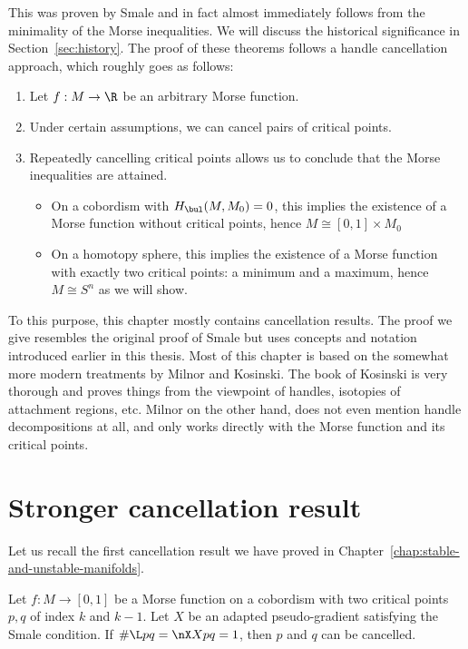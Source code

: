This was proven by Smale and in fact almost immediately follows from the minimality of the Morse inequalities.
We will discuss the historical significance in Section~\ref{sec:history}.
The proof of these theorems follows a handle cancellation approach, which roughly goes as follows:
\begin{enumerate}[(1)]
    \item Let $f: M \to  \R$ be an arbitrary Morse function.
    \item Under certain assumptions, we can cancel pairs of critical points.
    \item Repeatedly cancelling critical points allows us to conclude that the Morse inequalities are attained.
        \begin{itemize}
            \item On a cobordism with $H_\bul(M, M_0) = 0$, this implies the existence of a Morse function without critical points, hence $M \cong [0,1] \times M_0$
            \item On a homotopy sphere, this implies the existence of a Morse function with exactly two critical points: a minimum and a maximum,  hence $M \cong S^{n}$ as we will show.
        \end{itemize}
\end{enumerate}

To this purpose, this chapter mostly contains cancellation results.
The proof we give resembles the original proof of Smale but uses concepts and notation introduced earlier in this thesis.
Most of this chapter is based on the somewhat more modern treatments by Milnor and Kosinski.
The book of Kosinski is very thorough and proves things from the viewpoint of handles, isotopies of attachment regions, etc.
Milnor on the other hand, does not even mention handle decompositions at all, and only works directly with the Morse function and its critical points.




\section{Stronger cancellation result}
Let us recall the first cancellation result we have proved in Chapter~\ref{chap:stable-and-unstable-manifolds}.

\begingroup
\def\thetheorem{\ref{firstcancellation}}
\begin{theorem}
    Let $f: M \to  [0,1]$ be a Morse function on a cobordism with two critical points $p, q$ of index $k$ and  $k-1$. Let $X$ be an adapted pseudo-gradient satisfying the Smale condition.
    If $\# \L pq  = \nX Xpq = 1$, then $p$ and  $q$ can be cancelled.
\end{theorem}
\addtocounter{theorem}{-1}
\endgroup

